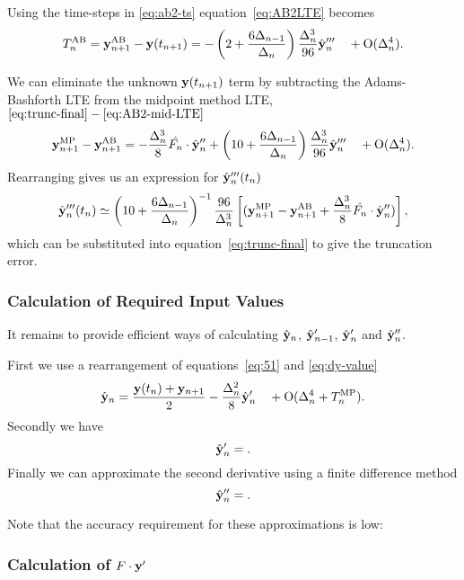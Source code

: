 Using the time-steps in \eqref{eq:ab2-ts} equation~\eqref{eq:AB2LTE} becomes
\begin{equation}
  T_n^{\text{AB}} = \mathbf{y}_{n+1}^{\text{AB}} - \mathbf{y}(t_{n+1})
  = - \left( 2 + \frac{6 \Delta_{n-1}}{\Delta_{n}} \right) \frac{\Delta_{n}^3}{96} \hat{\mathbf{y}}_{n}'''
  \quad + \text{O}(\Delta_{n}^4).
\label{eq:AB2-mid-LTE}
\end{equation}

We can eliminate the unknown $\mathbf{y}(t_{n+1})$ term by subtracting the Adams-Bashforth LTE from the midpoint method LTE, $\eqref{eq:trunc-final} - \eqref{eq:AB2-mid-LTE}$
\begin{equation}
 \mathbf{y}_{n+1}^{\text{MP}} - \mathbf{y}_{n+1}^{\text{AB}} =
  - \frac{\Delta_{n}^3}{8} \hat{F_{n}} \cdot \hat{\mathbf{y}}_{n}''
  + \left( 10 + \frac{6 \Delta_{n-1}}{\Delta_{n}} \right) \frac{\Delta_{n}^3}{96} \hat{\mathbf{y}}_{n}'''
  \quad + \text{O}(\Delta_{n}^4).
\end{equation}
Rearranging gives us an expression for $\hat{\mathbf{y}}_{n}'''(t_n)$
\begin{equation}
  \hat{\mathbf{y}}_{n}'''(t_n) \simeq
  \left( 10 + \frac{6 \Delta_{n-1}}{\Delta_{n}} \right)^{-1} \frac{96}{\Delta_{n}^3}
  \left[
    (\mathbf{y}_{n+1}^{\text{MP}} - \mathbf{y}_{n+1}^{\text{AB}} + \frac{\Delta_{n}^3}{8} \hat{F_{n}} \cdot \hat{\mathbf{y}}_{n}'')
    \right],
\end{equation}
which can be substituted into equation~\eqref{eq:trunc-final} to give the truncation error.

\subsubsection{Calculation of Required Input Values}

It remains to provide efficient ways of calculating $\hat{\mathbf{y}}_{n}$, $\hat{\mathbf{y}}_{n-1}'$, $\hat{\mathbf{y}}_{n}'$ and $\hat{\mathbf{y}}_{n}''$.

First we use a rearrangement of equations~\eqref{eq:51} and \eqref{eq:dy-value}
\begin{equation}
  \hat{\mathbf{y}}_{n} = \frac{\mathbf{y}(t_n) + \mathbf{y}_{n+1}}{2} -\frac{\Delta_{n}^2}{8} \hat{\mathbf{y}}_{n}' \quad + \text{O}(\Delta_{n}^4 + T_n^{\text{MP}}).
\end{equation}
Secondly we have
\begin{equation}
  \hat{\mathbf{y}}_{n}' =
.
\end{equation}
Finally we can approximate the second derivative using a finite difference method
\begin{equation}
  \hat{\mathbf{y}}_{n}'' =
.
\end{equation}

Note that the accuracy requirement for these approximations is low:

\subsubsection{Calculation of $F \cdot \mathbf{y}'$}

